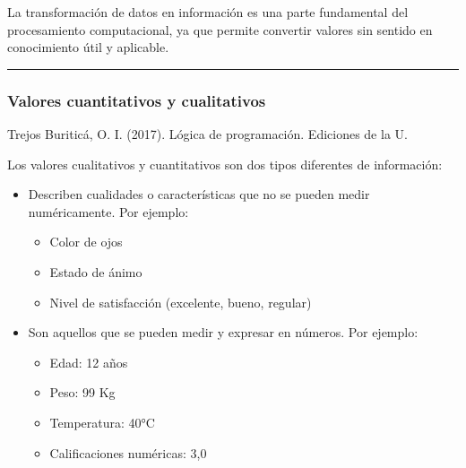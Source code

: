 \documentclass[letterpaper,10pt,spanish]{sphinxmanual}
\begin{document}
\sphinxAtStartPar
La transformación de datos en información es una parte fundamental del procesamiento computacional, ya que permite convertir valores sin sentido en conocimiento útil y aplicable.


\bigskip\hrule\bigskip



\subsubsection{Valores cuantitativos y cualitativos}
\label{\detokenize{1_guias/10programacion/G1022:valores-cuantitativos-y-cualitativos}}
\sphinxAtStartPar
%
\begin{footnote}[1]\sphinxAtStartFootnote
Trejos Buriticá, O. I. (2017). Lógica de programación. Ediciones de la U.
%
\end{footnote} Los valores cualitativos y cuantitativos son dos tipos diferentes de información:
\begin{itemize}
\item {} 
\sphinxAtStartPar
{} Describen cualidades o características que no se pueden medir numéricamente. Por ejemplo:
\begin{itemize}
\item {} 
\sphinxAtStartPar
Color de ojos

\item {} 
\sphinxAtStartPar
Estado de ánimo

\item {} 
\sphinxAtStartPar
Nivel de satisfacción (excelente, bueno, regular)

\end{itemize}

\item {} 
\sphinxAtStartPar
{} Son aquellos que se pueden medir y expresar en números. Por ejemplo:
\begin{itemize}
\item {} 
\sphinxAtStartPar
Edad: 12 años

\item {} 
\sphinxAtStartPar
Peso: 99 Kg

\item {} 
\sphinxAtStartPar
Temperatura: 40°C

\item {} 
\sphinxAtStartPar
Calificaciones numéricas: 3,0

\end{itemize}

\end{itemize}
\end{document}
